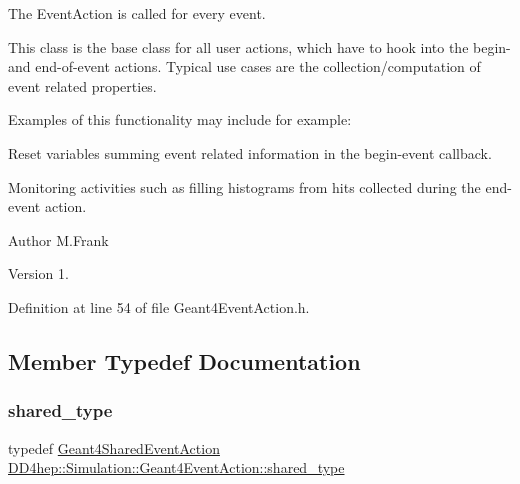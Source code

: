 The Event\+Action is called for every event.

This class is the base class for all user actions, which have to hook into the begin-\/ and end-\/of-\/event actions. Typical use cases are the collection/computation of event related properties.

Examples of this functionality may include for example\+:
\begin{DoxyItemize}
\item Reset variables summing event related information in the begin-\/event callback.
\item Monitoring activities such as filling histograms from hits collected during the end-\/event action.

\begin{DoxyAuthor}{Author}
M.\+Frank 
\end{DoxyAuthor}
\begin{DoxyVersion}{Version}
1. 
\end{DoxyVersion}

\end{DoxyItemize}

Definition at line 54 of file Geant4\+Event\+Action.\+h.



\subsection{Member Typedef Documentation}
\hypertarget{class_d_d4hep_1_1_simulation_1_1_geant4_event_action_abef0506a1372b5723ccfb84ec11675e4}{}\label{class_d_d4hep_1_1_simulation_1_1_geant4_event_action_abef0506a1372b5723ccfb84ec11675e4} 
\subsubsection{\texorpdfstring{shared\+\_\+type}{shared\_type}}
{\footnotesize\ttfamily typedef \hyperlink{class_d_d4hep_1_1_simulation_1_1_geant4_shared_event_action}{Geant4\+Shared\+Event\+Action} \hyperlink{class_d_d4hep_1_1_simulation_1_1_geant4_event_action_abef0506a1372b5723ccfb84ec11675e4}{D\+D4hep\+::\+Simulation\+::\+Geant4\+Event\+Action\+::shared\+\_\+type}}



